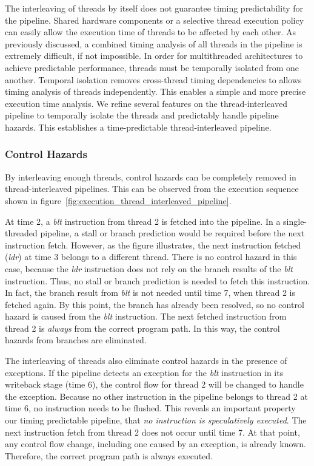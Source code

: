 The interleaving of threads by itself does not guarantee timing predictability for the pipeline.  
Shared hardware components or a selective thread execution policy can easily allow the execution time of threads to be affected by each other.    
As previously discussed, a combined timing analysis of all threads in the pipeline is extremely difficult, if not impossible.
In order for multithreaded architectures to achieve predictable performance, threads must be temporally isolated from one another. 
Temporal isolation removes cross-thread timing dependencies to allows timing analysis of threads independently.
This enables a simple and more precise execution time analysis.  
We refine several features on the thread-interleaved pipeline to temporally isolate the threads and predictably handle pipeline hazards.
This establishes a time-predictable thread-interleaved pipeline.

\subsubsection{Control Hazards}
By interleaving enough threads, control hazards can be completely removed in thread-interleaved pipelines.
This can be observed from the execution sequence shown in figure~\ref{fig:execution_thread_interleaved_pipeline}.

At time 2, a \emph{blt} instruction from thread 2 is fetched into the pipeline.
In a single-threaded pipeline, a stall or branch prediction would be required before the next instruction fetch.
However, as the figure illustrates, the next instruction fetched (\emph{ldr}) at time 3 belongs to a different thread.
There is no control hazard in this case, because the \emph{ldr} instruction does not rely on the branch results of the \emph{blt} instruction.  
Thus, no stall or branch prediction is needed to fetch this instruction.
In fact, the branch result from \emph{blt} is not needed until time 7, when thread 2 is fetched again.
By this point, the branch has already been resolved, so no control hazard is caused from the \emph{blt} instruction.
The next fetched instruction from thread 2 is \emph{always} from the correct program path.
In this way, the control hazards from branches are eliminated.  
  
The interleaving of threads also eliminate control hazards in the presence of exceptions.
If the pipeline detects an exception for the \emph{blt} instruction in its writeback stage (time 6), the control flow for thread 2 will be changed to handle the exception.  
Because no other instruction in the pipeline belongs to thread 2 at time 6, no instruction needs to be flushed.  
This reveals an important property our timing predictable pipeline, that \emph{no instruction is speculatively executed}.
The next instruction fetch from thread 2 does not occur until time 7.
At that point, any control flow change, including one caused by an exception, is already known.
Therefore, the correct program path is always executed.

